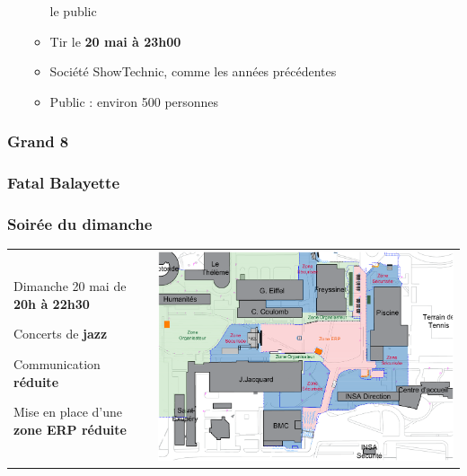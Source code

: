 \documentclass[xcolor=table]{beamer}
\let\\\tabularnewline
\let\\\tabularnewline
\begin{document}
\begin{frame}
\begin{frame}
\begin{itemize}
\begin{itemize}
le public
\item Tir le \textbf{20 mai à 23h00}
\item Société ShowTechnic, comme les années précédentes
\item Public : environ 500 personnes
\end{itemize}
\end{itemize}

\end{frame}

\begin{frame}

\frametitle{Grand 8}

\end{frame}

\begin{frame}

\frametitle{Fatal Balayette}

\end{frame}

\begin{frame}

\frametitle{Soirée du dimanche}
\begin{tabular}{i{.35\textwidth} c}
\item Dimanche 20 mai de \textbf{20h à 22h30}
\vspace{1mm}
\item Concerts de \textbf{jazz}
\vspace{1mm}
\item Communication \textbf{réduite}
\vspace{1mm}
\item Mise en place d'une \textbf{zone ERP réduite}
& \includegraphics[width=.6\textwidth, trim=200 0 0 30,clip]{Exports/Plan_24h_43eme-ERP_Dimanche}\\
\end{tabular}

\end{frame}

\begin{frame}


\end{frame}
\end{frame}
\end{document}
